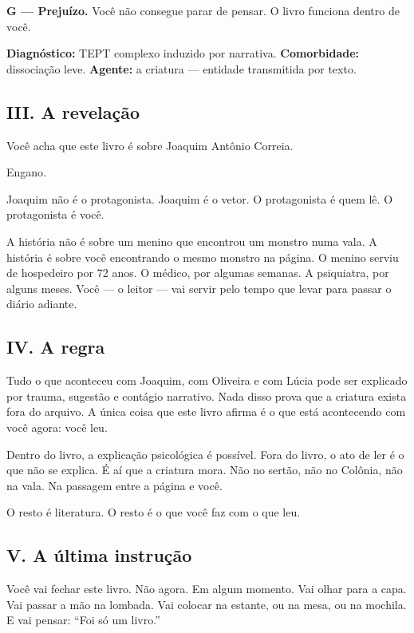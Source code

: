 \noindent \textbf{G --- Prejuízo.} Você não consegue parar de pensar. O livro funciona dentro de você.

\noindent \textbf{Diagnóstico:} TEPT complexo induzido por narrativa. \textbf{Comorbidade:} dissociação leve. \textbf{Agente:} a criatura --- entidade transmitida por texto.

\subsection*{III. A revelação}

\noindent Você acha que este livro é sobre Joaquim Antônio Correia.

\noindent Engano.

\noindent Joaquim não é o protagonista. Joaquim é o vetor. O protagonista é quem lê. O protagonista é você.

\noindent A história não é sobre um menino que encontrou um monstro numa vala. A história é sobre você encontrando o mesmo monstro na página. O menino serviu de hospedeiro por 72 anos. O médico, por algumas semanas. A psiquiatra, por alguns meses. Você --- o leitor --- vai servir pelo tempo que levar para passar o diário adiante.

\subsection*{IV. A regra}

\noindent Tudo o que aconteceu com Joaquim, com Oliveira e com Lúcia pode ser explicado por trauma, sugestão e contágio narrativo. Nada disso prova que a criatura exista fora do arquivo. A única coisa que este livro afirma é o que está acontecendo com você agora: você leu.

\noindent Dentro do livro, a explicação psicológica é possível. Fora do livro, o ato de ler é o que não se explica. É aí que a criatura mora. Não no sertão, não no Colônia, não na vala. Na passagem entre a página e você.

\noindent O resto é literatura. O resto é o que você faz com o que leu.

\subsection*{V. A última instrução}

\noindent Você vai fechar este livro. Não agora. Em algum momento. Vai olhar para a capa. Vai passar a mão na lombada. Vai colocar na estante, ou na mesa, ou na mochila. E vai pensar: ``Foi só um livro.''

